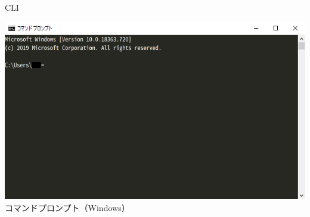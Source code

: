 \documentclass[12pt,aspectratio=169]{beamer}
\begin{document}
\begin{frame}{CLI}

  \begin{minipage}{0.3\textwidth}
    \includegraphics[width=1.2\linewidth,bb=0 0 698 412]{./images/cmd.png}
    コマンドプロンプト（Windows）


\end{minipage}
\end{frame}
\end{document}
